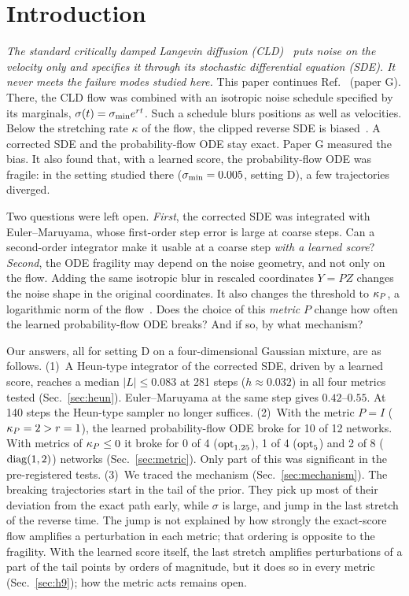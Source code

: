 \section{Introduction}
\label{sec:intro}

\emph{The standard critically damped Langevin diffusion (CLD)~\cite{dockhorn2022cld} puts noise on the velocity only and specifies it through its stochastic differential equation (SDE). It never meets the failure modes studied here.}
This paper continues Ref.~\cite{namba2026paperG} (paper G).
There, the CLD flow was combined with an isotropic noise schedule specified by its marginals, $\sigma(t)=\sigma_{\min} e^{rt}$.
Such a schedule blurs positions as well as velocities.
Below the stretching rate $\kappa$ of the flow, the clipped reverse SDE is biased~\cite{namba2026threshold}.
A corrected SDE and the probability-flow ODE stay exact.
Paper G measured the bias.
It also found that, with a learned score, the probability-flow ODE was fragile: in the setting studied there ($\sigma_{\min}=0.005$, setting D), a few trajectories diverged.

Two questions were left open.
\emph{First}, the corrected SDE was integrated with Euler--Maruyama, whose first-order step error is large at coarse steps.
Can a second-order integrator make it usable at a coarse step \emph{with a learned score}?
\emph{Second}, the ODE fragility may depend on the noise geometry, and not only on the flow.
Adding the same isotropic blur in rescaled coordinates $Y=PZ$ changes the noise shape in the original coordinates.
It also changes the threshold to $\kappa_P$, a logarithmic norm of the flow~\cite{soderlind2006lognorm}.
Does the choice of this \emph{metric} $P$ change how often the learned probability-flow ODE breaks?
And if so, by what mechanism?

Our answers, all for setting D on a four-dimensional Gaussian mixture, are as follows.
(1)~A Heun-type integrator of the corrected SDE, driven by a learned score, reaches a median $|L|\leq0.083$ at 281 steps ($h\approx0.032$) in all four metrics tested (Sec.~\ref{sec:heun}).
Euler--Maruyama at the same step gives $0.42$--$0.55$.
At 140 steps the Heun-type sampler no longer suffices.
(2)~With the metric $P=I$ ($\kappa_P=2>r=1$), the learned probability-flow ODE broke for 10 of 12 networks.
With metrics of $\kappa_P\leq0$ it broke for 0 of 4 ($\mathrm{opt}_{1.25}$), 1 of 4 ($\mathrm{opt}_{5}$) and 2 of 8 ($\mathrm{diag}(1,2)$) networks (Sec.~\ref{sec:metric}).
Only part of this was significant in the pre-registered tests.
(3)~We traced the mechanism (Sec.~\ref{sec:mechanism}).
The breaking trajectories start in the tail of the prior.
They pick up most of their deviation from the exact path early, while $\sigma$ is large, and jump in the last stretch of the reverse time.
The jump is not explained by how strongly the exact-score flow amplifies a perturbation in each metric; that ordering is opposite to the fragility.
With the learned score itself, the last stretch amplifies perturbations of a part of the tail points by orders of magnitude, but it does so in every metric (Sec.~\ref{sec:h9}); how the metric acts remains open.

